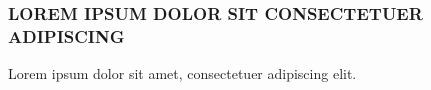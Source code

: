 \documentclass[12pt, aspectratio=169]{beamer}
\begin{document}
\begin{frame}
    \frametitle{LOREM IPSUM DOLOR SIT CONSECTETUER ADIPISCING}
    Lorem ipsum dolor sit amet, consectetuer adipiscing elit.
\end{frame}



\begin{frame}
\end{frame}
\end{document}
